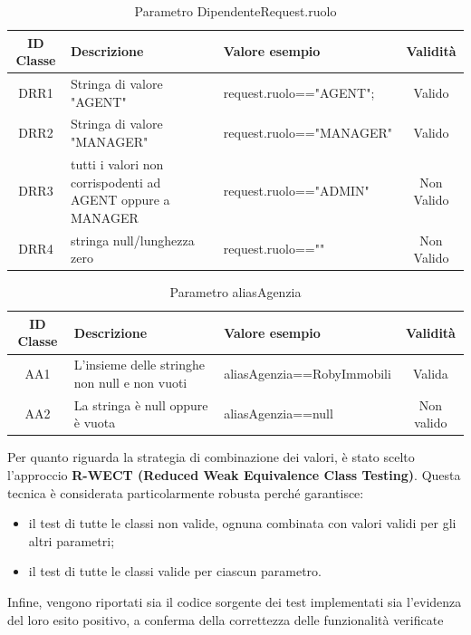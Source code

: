 \begin{table}[H]
	\centering
	\begin{tabular}{|c|p{4cm}|p{5.5cm}|c|} 
		\hline
		\textbf{ID Classe} & \textbf{Descrizione} & \textbf{Valore esempio} & \textbf{Validità} \\
		\hline
		DRR1 & Stringa di valore "AGENT"
		& request.ruolo=="AGENT"; & Valido \\
		\hline
		DRR2 & Stringa di valore "MANAGER"
		& request.ruolo=="MANAGER" & Valido \\
		\hline
		DRR3 & tutti i valori non corrispodenti ad AGENT oppure a MANAGER
		& request.ruolo=="ADMIN" & Non Valido \\
		\hline
		DRR4 & stringa null/lunghezza zero
		& request.ruolo=="" & Non Valido \\
		\hline
	\end{tabular}
	\caption{Parametro DipendenteRequest.ruolo}
	\label{tab:placeholder}
\end{table}

\begin{table}[H]
	\centering
	\begin{tabular}{|c|p{4cm}|p{5.5cm}|c|} 
		\hline
		\textbf{ID Classe} & \textbf{Descrizione} & \textbf{Valore esempio} & \textbf{Validità} \\
		\hline
		AA1 & L'insieme delle stringhe non null e non vuoti & aliasAgenzia==RobyImmobili & Valida \\
		\hline
		AA2 & La stringa è null oppure è vuota & aliasAgenzia==null & Non valido \\
		\hline
	\end{tabular}
	\caption{Parametro aliasAgenzia}
	\label{tab:placeholder}
\end{table}

\vspace{1cm}

Per quanto riguarda la strategia di combinazione dei valori, è stato scelto l’approccio \textbf{R-WECT (Reduced Weak Equivalence Class Testing)}. Questa tecnica è considerata particolarmente robusta perché garantisce:

\begin{itemize}
	\item il test di tutte le classi non valide, ognuna combinata con valori validi per gli altri parametri;
	\item il test di tutte le classi valide per ciascun parametro.
\end{itemize}

Infine, vengono riportati sia il codice sorgente dei test implementati sia l’evidenza del loro esito positivo, a conferma della correttezza delle funzionalità verificate

